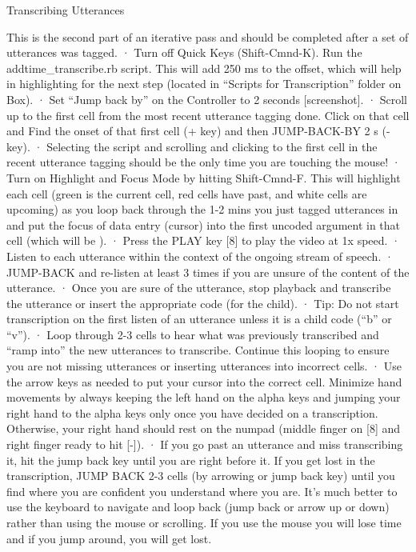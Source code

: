 \documentclass[
]{book}
\begin{document}
Transcribing Utterances

This is the second part of an iterative pass and should be completed after a set of utterances was tagged.
· Turn off Quick Keys (Shift-Cmnd-K).
Run the addtime\_transcribe.rb script. This will add 250 ms to the offset, which will help in highlighting for the next step (located in ``Scripts for Transcription'' folder on Box).
· Set ``Jump back by'' on the Controller to 2 seconds {[}screenshot{]}.
· Scroll up to the first cell from the most recent utterance tagging done. Click on that cell and Find the onset of that first cell (+ key) and then JUMP-BACK-BY 2 s (- key).
· Selecting the script and scrolling and clicking to the first cell in the recent utterance tagging should be the only time you are touching the mouse!
· Turn on Highlight and Focus Mode by hitting Shift-Cmnd-F. This will highlight each cell (green is the current cell, red cells have past, and white cells are upcoming) as you loop back through the 1-2 mins you just tagged utterances in and put the focus of data entry (cursor) into the first uncoded argument in that cell (which will be ).
· Press the PLAY key {[}8{]} to play the video at 1x speed.
· Listen to each utterance within the context of the ongoing stream of speech.
· JUMP-BACK and re-listen at least 3 times if you are unsure of the content of the utterance.
· Once you are sure of the utterance, stop playback and transcribe the utterance or insert the appropriate code (for the child).
· Tip: Do not start transcription on the first listen of an utterance unless it is a child code (``b'' or ``v'').
· Loop through 2-3 cells to hear what was previously transcribed and ``ramp into'' the new utterances to transcribe. Continue this looping to ensure you are not missing utterances or inserting utterances into incorrect cells.
· Use the arrow keys as needed to put your cursor into the correct cell. Minimize hand movements by always keeping the left hand on the alpha keys and jumping your right hand to the alpha keys only once you have decided on a transcription. Otherwise, your right hand should rest on the numpad (middle finger on {[}8{]} and right finger ready to hit {[}-{]}).
· If you go past an utterance and miss transcribing it, hit the jump back key until you are right before it. If you get lost in the transcription, JUMP BACK 2-3 cells (by arrowing or jump back key) until you find where you are confident you understand where you are. It's much better to use the keyboard to navigate and loop back (jump back or arrow up or down) rather than using the mouse or scrolling. If you use the mouse you will lose time and if you jump around, you will get lost.
\end{document}

